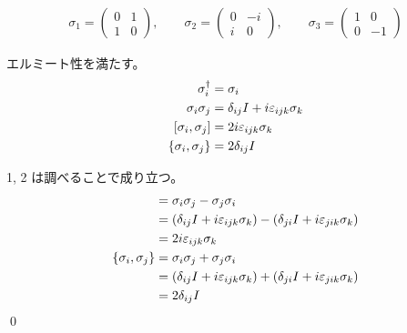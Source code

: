 \documentclass[uplatex,dvipdfmx,a4paper,11pt]{jlreq}
\makeatletter
\theoremstyle{definition}
\renewenvironment{proof}[1][\proofname]{\par
  \normalfont
  \topsep6\p@\@plus6\p@ \trivlist
  \item[\hskip\labelsep{\bfseries #1}\@addpunct{\bfseries}]\ignorespaces\quad\par
}{%
  \qed\endtrivlist\@endpefalse
}
\renewcommand\proofname{証明}
\makeatother
\begin{document}
\begin{definition}[パウリ行列]
  \begin{align}
    \sigma_1 = \begin{pmatrix}
                 0 & 1 \\
                 1 & 0
               \end{pmatrix}, \qquad
    \sigma_2 = \begin{pmatrix}
                 0 & -i \\
                 i & 0
               \end{pmatrix}, \qquad
    \sigma_3 = \begin{pmatrix}
                 1 & 0  \\
                 0 & -1
               \end{pmatrix}
  \end{align}
\end{definition}

\begin{proposition}[パウリ行列の性質]
  エルミート性を満たす。
  \begin{align}
    \sigma_i^\dagger         & = \sigma_i                                  \\
    \sigma_i\sigma_j         & = \delta_{ij}I + i\varepsilon_{ijk}\sigma_k \\
    [\sigma_i, \sigma_j]     & = 2i\varepsilon_{ijk}\sigma_k               \\
    \qty{\sigma_i, \sigma_j} & = 2\delta_{ij}I
  \end{align}
\end{proposition}
\begin{proof}
  1, 2 は調べることで成り立つ。
  \begin{align}
    [\sigma_i, \sigma_j]     & = \sigma_i\sigma_j - \sigma_j\sigma_i                                                       \\
                             & = (\delta_{ij}I + i\varepsilon_{ijk}\sigma_k) - (\delta_{ji}I + i\varepsilon_{jik}\sigma_k) \\
                             & = 2i\varepsilon_{ijk}\sigma_k                                                               \\
    \qty{\sigma_i, \sigma_j} & = \sigma_i\sigma_j + \sigma_j\sigma_i                                                       \\
                             & = (\delta_{ij}I + i\varepsilon_{ijk}\sigma_k) + (\delta_{ji}I + i\varepsilon_{jik}\sigma_k) \\
                             & = 2\delta_{ij}I
  \end{align}
\end{proof}
\end{document}
